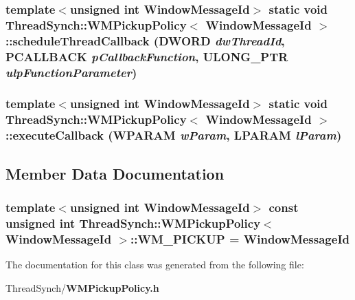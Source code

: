 \subsubsection{\setlength{\rightskip}{0pt plus 5cm}template$<$unsigned int Window\-Message\-Id$>$ static void {\bf Thread\-Synch::WMPickup\-Policy}$<$ Window\-Message\-Id $>$::schedule\-Thread\-Callback (DWORD {\em dw\-Thread\-Id}, {\bf PCALLBACK} {\em p\-Callback\-Function}, ULONG\_\-PTR {\em ulp\-Function\-Parameter})\hspace{0.3cm}{\tt  [inline, static]}}\label{class_thread_synch_1_1_w_m_pickup_policy_93ef619297aa14ca4d3971cac3ac3ad4}


\subsubsection{\setlength{\rightskip}{0pt plus 5cm}template$<$unsigned int Window\-Message\-Id$>$ static void {\bf Thread\-Synch::WMPickup\-Policy}$<$ Window\-Message\-Id $>$::execute\-Callback (WPARAM {\em w\-Param}, LPARAM {\em l\-Param})\hspace{0.3cm}{\tt  [inline, static]}}\label{class_thread_synch_1_1_w_m_pickup_policy_69c25001f589484275d23dcf0416be25}




\subsection{Member Data Documentation}
\subsubsection{\setlength{\rightskip}{0pt plus 5cm}template$<$unsigned int Window\-Message\-Id$>$ const unsigned int {\bf Thread\-Synch::WMPickup\-Policy}$<$ Window\-Message\-Id $>$::{\bf WM\_\-PICKUP} = Window\-Message\-Id\hspace{0.3cm}{\tt  [static]}}\label{class_thread_synch_1_1_w_m_pickup_policy_020c8da710e67d238a11dae34df034c2}




The documentation for this class was generated from the following file:\begin{CompactItemize}
\item 
Thread\-Synch/{\bf WMPickup\-Policy.h}\end{CompactItemize}
